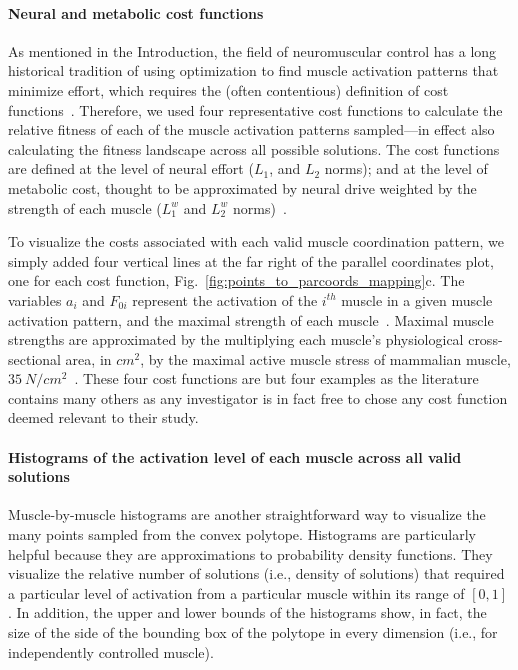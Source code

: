 \documentclass[9pt,twocolumn,twoside,lineno]{pnas-new}
\begin{document}
{\paragraph*{Neural and metabolic cost functions}

As mentioned in the Introduction, the field of neuromuscular control has a long historical tradition of using optimization to find muscle activation patterns that minimize effort, which requires the (often contentious) definition of cost functions~\cite{spoor1983balancing,Chao1978Graphical,Prilutsky2000Muscle,crowninshield1981physiologically}. Therefore, we used four representative cost functions to calculate the relative fitness of each of the muscle activation patterns sampled---in effect also calculating the fitness landscape across all possible solutions. The cost functions are defined at the level of neural effort ($L_1$, and $L_2$ norms); and at the level of metabolic cost, thought to be approximated by neural drive weighted by the strength of each muscle ($L_1^w$ and $L_2^w$ norms)~\cite{Prilutsky2000Muscle,crowninshield1981physiologically}.

To visualize the costs associated with each valid muscle coordination pattern, we simply added four vertical lines at the far right of the parallel coordinates plot, one for each cost function, Fig.~\ref{fig:points_to_parcoords_mapping}c. The variables $a_i$ and $F_{0i}$ represent the activation of the $i^{th}$ muscle in a given muscle activation pattern, and the maximal strength of each muscle~\cite{Prilutsky2000Muscle,crowninshield1981physiologically}. Maximal muscle strengths are approximated by the multiplying each muscle's physiological cross-sectional area, in $cm^2$, by the maximal active muscle stress of mammalian muscle, $35~N/{cm^2}$~\cite{Zajac1993Muscle}. These four cost functions are but four examples as the literature contains many others as any investigator is in fact free to chose any cost function deemed relevant to their study.


\paragraph*{Histograms of the activation level of each muscle across all valid solutions}

Muscle-by-muscle histograms are another straightforward way to visualize the many points sampled from the convex polytope. Histograms are particularly helpful because they are approximations to probability density functions.
They visualize the relative number of solutions (i.e., density of solutions) that required a particular level of activation from a particular muscle within its range of $[0,1]$.
In addition, the upper and lower bounds of the histograms show, in fact, the size of the side of the bounding box of the polytope in every dimension (i.e., for independently controlled muscle).

}
\end{document}
